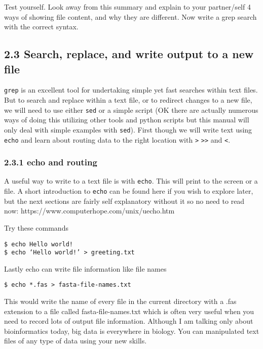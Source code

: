 \documentclass[11pt]{article}
\begin{document}
Test yourself. Look away from this summary and explain to your
partner/self 4 ways of showing file content, and why they are different.
Now write a grep search with the correct syntax.

    \hypertarget{search-replace-and-write-output-to-a-new-file}{%
\subsection{2.3 Search, replace, and write output to a new
file}\label{search-replace-and-write-output-to-a-new-file}}

\texttt{grep} is an excellent tool for undertaking simple yet fast
searches within text files. But to search and replace within a text
file, or to redirect changes to a new file, we will need to use either
\texttt{sed} or a simple script (OK there are actually numerous ways of
doing this utilizing other tools and python scripts but this manual will
only deal with simple examples with \texttt{sed}). First though we will
write text using \texttt{echo} and learn about routing data to the right
location with \texttt{\textgreater{}}
\texttt{\textgreater{}\textgreater{}} and \texttt{\textless{}}.

    \hypertarget{echo-and-routing}{%
\subsubsection{2.3.1 echo and routing}\label{echo-and-routing}}

A useful way to write to a text file is with \texttt{echo}. This will
print to the screen or a file. A short introduction to \texttt{echo} can
be found here if you wish to explore later, but the next sections are
fairly self explanatory without it so no need to read now:
https://www.computerhope.com/unix/uecho.htm

Try these commands

\begin{verbatim}
$ echo Hello world!
$ echo ‘Hello world!’ > greeting.txt
\end{verbatim}

    Lastly echo can write file information like file names

\begin{verbatim}
$ echo *.fas > fasta-file-names.txt
\end{verbatim}

This would write the name of every file in the current directory with a
.fas extension to a file called fasta-file-names.txt which is often very
useful when you need to record lots of output file information. Although
I am talking only about bioinformatics today, big data is everywhere in
biology. You can manipulated text files of any type of data using your
new skills.
\end{document}
